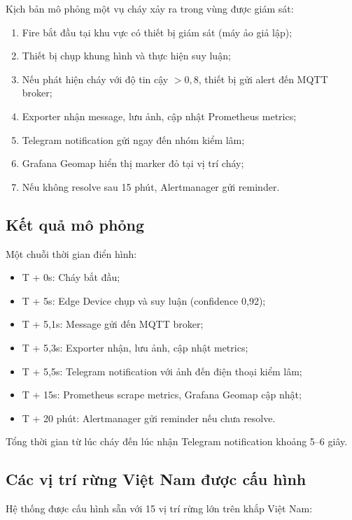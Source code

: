 \documentclass[12pt,a4paper]{report}
\begin{document}
Kịch bản mô phỏng một vụ cháy xảy ra trong vùng được giám sát:
\begin{enumerate}
  \item Fire bắt đầu tại khu vực có thiết bị giám sát (máy ảo giả lập);
  \item Thiết bị chụp khung hình và thực hiện suy luận;
  \item Nếu phát hiện cháy với độ tin cậy $> 0{,}8$, thiết bị gửi alert đến MQTT broker;
  \item Exporter nhận message, lưu ảnh, cập nhật Prometheus metrics;
  \item Telegram notification gửi ngay đến nhóm kiểm lâm;
  \item Grafana Geomap hiển thị marker đỏ tại vị trí cháy;
  \item Nếu không resolve sau 15 phút, Alertmanager gửi reminder.
\end{enumerate}

\subsection{Kết quả mô phỏng}

Một chuỗi thời gian điển hình:
\begin{itemize}
  \item T + 0s: Cháy bắt đầu;
  \item T + 5s: Edge Device chụp và suy luận (confidence 0{,}92);
  \item T + 5{,}1s: Message gửi đến MQTT broker;
  \item T + 5{,}3s: Exporter nhận, lưu ảnh, cập nhật metrics;
  \item T + 5{,}5s: Telegram notification với ảnh đến điện thoại kiểm lâm;
  \item T + 15s: Prometheus scrape metrics, Grafana Geomap cập nhật;
  \item T + 20 phút: Alertmanager gửi reminder nếu chưa resolve.
\end{itemize}

Tổng thời gian từ lúc cháy đến lúc nhận Telegram notification khoảng 5--6 giây.

\subsection{Các vị trí rừng Việt Nam được cấu hình}

Hệ thống được cấu hình sẵn với 15 vị trí rừng lớn trên khắp Việt Nam:
\end{document}
